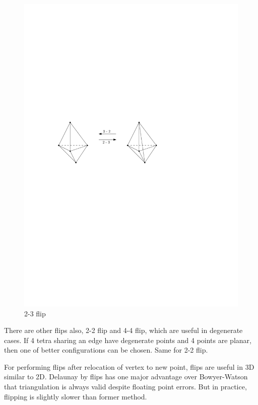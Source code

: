 \begin{enumerate}
\begin{figure}[ht]
    \centering
    \includegraphics{images/2-3.pdf}
    \caption{2-3 flip}
    \label{fig:2_3_flip}
\end{figure}

\end{enumerate}

There are other flips also, 2-2 flip and 4-4 flip, which are useful in degenerate cases. If 4 tetra sharing an edge have degenerate points and 4 points are planar, then one of better configurations can be chosen. Same for 2-2 flip.

For performing flips after relocation of vertex to new point, flips are useful in 3D similar to 2D. Delaunay by flips has one major advantage over Bowyer-Watson that triangulation is always valid despite floating point errors. But in practice, flipping is slightly slower than former method.

